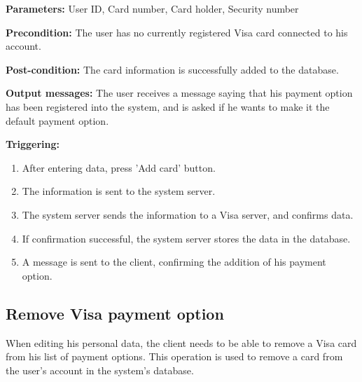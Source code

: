 \begin{description}

\item \textbf{Parameters:} User ID, Card number, Card holder, Security number

\item \textbf{Precondition:} The user has no currently registered Visa card
connected to his account.

\item \textbf{Post-condition:} The card information is successfully added to the
database.

\item \textbf{Output messages:} The user receives a message saying that his
payment option has been registered into the system, and is asked if he wants to
make it the default payment option.

\item \textbf{Triggering:}
\begin{enumerate}
\item After entering data, press 'Add card' button.

\item The information is sent to the system server.

\item The system server sends the information to a Visa server, and confirms
data.

\item If confirmation successful, the system server stores the data in the
database.

\item A message is sent to the client, confirming the addition of his payment
option.

\end{enumerate}

\end{description}

\subsection{Remove Visa payment option}

 When editing his personal data, the client needs to be
 able to remove a Visa card from his list of payment options. This operation is
 used to remove a card from the user's account in the system's database.

